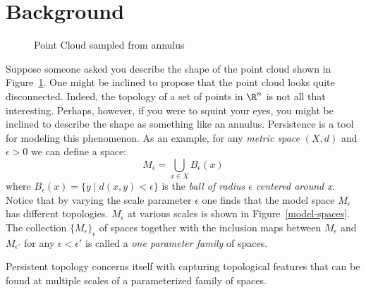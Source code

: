\section{Background}

\begin{figure}
\centering
{}      
 \hspace{.5cm}
 \caption{Point Cloud sampled from annulus}
\label{fig:point-cloud-annulus}
 \end{figure}

Suppose someone asked you describe the shape of the point cloud shown in Figure~\ref{fig:point-cloud-annulus}. One might be inclined to propose that the point cloud looks quite disconnected. Indeed, the topology of a set of points in $\R^n$ is not all that interesting. Perhaps, however, if you were to squint your eyes, you might be inclined to describe the shape as something like an annulus. Persistence is a tool for modeling this phenomenon. As an example, for any \emph{metric space} $(X,d)$ and  $\epsilon > 0$ we can define a space: \[ M_\epsilon = \bigcup_{x \in X} B_{\epsilon}(x) \] where $B_{\epsilon}(x) = \{ y \mid d(x,y) < \epsilon\} $ is the \emph{ball of radius $\epsilon$ centered around x}. Notice that by varying the scale parameter $\epsilon$ one finds that the model space $M_\epsilon$ has different topologies. $M_\epsilon$ at various scales is shown in Figure~\ref{model-spaces}. The collection $\{M_\epsilon\}_\epsilon$ of spaces together with the inclusion maps between $M_\epsilon$ and $M_{\epsilon'}$ for any $\epsilon < \epsilon'$ is called a \emph{one parameter family} of spaces.   
 
Persistent topology concerns itself with capturing topological features that can be found at multiple scales of a parameterized family of spaces.


